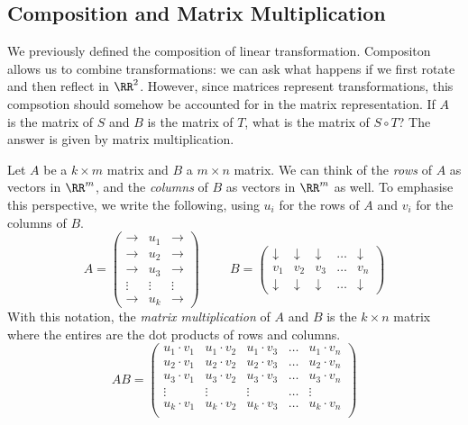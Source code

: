 \documentclass[fleqn]{report}
\begin{document}
\subsection{Composition and Matrix Multiplication}
\label{matrix-multiplication}

We previously defined the composition of linear
transformation. Compositon allows us to combine
transformations: we can ask what happens if we first rotate
and then reflect in $\RR^2$. However, since matrices
represent transformations, this compsotion should somehow be
accounted for in the matrix representation. If $A$ is the
matrix of $S$ and $B$ is the matrix of $T$, what is the matrix
of $S \circ T$? The answer is given by matrix multiplication.

\begin{defn}
Let $A$ be a $k \times m$ matrix and $B$ a $m \times n$
matrix. We can think of the \emph{rows} of $A$ as vectors in
$\RR^m$, and the \emph{columns} of $B$ as vectors in $\RR^m$
as well. To emphasise this perspective, we write the following,
using $u_i$ for the rows of $A$ and $v_i$ for the columns of
$B$.
\begin{equation*}
A = \left( \begin{matrix}
\rightarrow & u_1 & \rightarrow \\
\rightarrow & u_2 & \rightarrow \\
\rightarrow & u_3 & \rightarrow \\
\vdots & \vdots & \vdots \\
\rightarrow & u_k & \rightarrow 
\end{matrix} \right) 
\hspace{1cm}
B = \left( \begin{matrix}
\downarrow & \downarrow & \downarrow & \ldots & \downarrow \\
v_1 & v_2 & v_3 & \ldots & v_n \\
\downarrow & \downarrow & \downarrow & \ldots & \downarrow 
\end{matrix} \right) 
\end{equation*}
With this notation, the \emph{matrix multiplication} of
$A$ and $B$ is the $k \times n$ matrix where the entires are
the dot products of rows and columns.
\begin{equation*}
AB = \left( \begin{matrix} 
u_1 \cdot v_1 &
u_1 \cdot v_2 &
u_1 \cdot v_3 &
\ldots &
u_1 \cdot v_n \\
u_2 \cdot v_1 &
u_2 \cdot v_2 &
u_2 \cdot v_3 &
\ldots &
u_2 \cdot v_n \\
u_3 \cdot v_1 &
u_3 \cdot v_2 &
u_3 \cdot v_3 &
\ldots &
u_3 \cdot v_n \\
\vdots & \vdots & \vdots & \ldots & \vdots \\
u_k \cdot v_1 &
u_k \cdot v_2 &
u_k \cdot v_3 &
\ldots &
u_k \cdot v_n \\
\end{matrix} \right) 
\end{equation*}
\end{defn}
\end{document}
